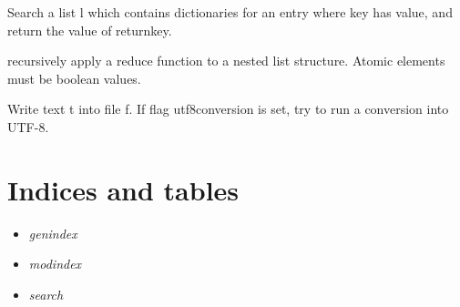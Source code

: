 \documentclass[a4paper,10pt,english]{sphinxmanual}
\begin{document}

\begin{fulllineitems}
\label{sourcecodedoc:utils.searchListOfDicts}
Search a list l which contains dictionaries for an entry
where key has value, and return the value of returnkey.

\end{fulllineitems}


\begin{fulllineitems}
\label{sourcecodedoc:utils.treeReduce}
recursively apply a reduce function to a nested list structure.
Atomic elements must be boolean values.

\end{fulllineitems}


\begin{fulllineitems}
\label{sourcecodedoc:utils.writefile}
Write text t into file f. If flag utf8conversion is set,
try to run a conversion into UTF-8.

\end{fulllineitems}



\chapter{Indices and tables}
\label{index:indices-and-tables}\begin{itemize}
\item {} 
\emph{genindex}

\item {} 
\emph{modindex}

\item {} 
\emph{search}

\end{itemize}
\end{document}
